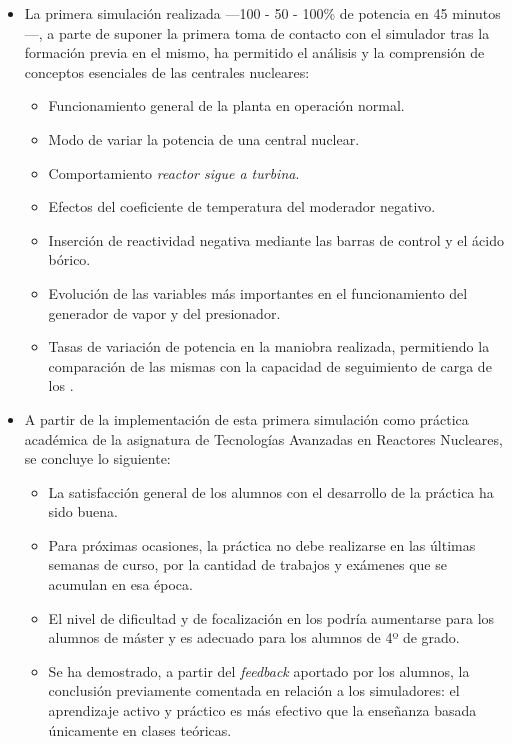 \begin{itemize}
    \item La primera simulación realizada ---100 - 50 - 100\% de potencia en 45 minutos---, a parte de suponer la primera toma de contacto con el simulador tras la formación previa en el mismo, ha permitido el análisis y la comprensión de conceptos esenciales de las centrales nucleares:
    \begin{itemize}
        \item Funcionamiento general de la planta en operación normal.
        \item Modo de variar la potencia de una central nuclear.
        \item Comportamiento \textit{reactor sigue a turbina}.
        \item Efectos del coeficiente de temperatura del moderador negativo.
        \item Inserción de reactividad negativa mediante las barras de control y el ácido bórico. 
        \item Evolución de las variables más importantes en el funcionamiento del generador de vapor y del presionador.
        \item Tasas de variación de potencia en la maniobra realizada, permitiendo la comparación de las mismas con la capacidad de seguimiento de carga de los .
    \end{itemize}
    \item A partir de la implementación de esta primera simulación como práctica académica de la asignatura de Tecnologías Avanzadas en Reactores Nucleares, se concluye lo siguiente:
    \begin{itemize}
        \item La satisfacción general de los alumnos con el desarrollo de la práctica ha sido buena.
        \item Para próximas ocasiones, la práctica no debe realizarse en las últimas semanas de curso, por la cantidad de trabajos y exámenes que se acumulan en esa época.
        \item El nivel de dificultad y de focalización en los  podría aumentarse para los alumnos de máster y es adecuado para los alumnos de 4º de grado.
        \item Se ha demostrado, a partir del \textit{feedback} aportado por los alumnos, la conclusión previamente comentada en relación a los simuladores: el aprendizaje activo y práctico es más efectivo que la enseñanza basada únicamente en clases teóricas.

\end{itemize}
\end{itemize}
